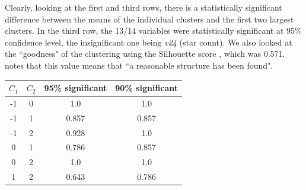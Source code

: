 \documentclass[12pt,a4paper,twocolumn]{article}
\begin{document}
	Clearly, looking at the first and third rows, there is a statistically significant difference between the means of the individual clusters and the first two largest clusters. In the third row, the 13/14 variables were statistically significant at 95\% confidence level, the insignificant one being \textit{v24} (star count). We also looked at the ``goodness" of the clustering using the Silhouette score \cite{rousseeuw1987silhouettes}, which was 0.571. \cite{kaufman2009finding} notes that this value means that ``a reasonable structure has been found".\\
	
	\begin{tabular}{|c|c|c|c|}
		\hline 
		$C_1$ & $C_2$ & \textbf{95\% significant} & \textbf{90\% significant} \\ 
		\hline 
		-1 & 0 & 1.0 & 1.0 \\ 
		\hline 
		-1 & 1 & 0.857 & 0.857 \\ 
		\hline 
		-1 & 2 & 0.928 & 1.0 \\ 
		\hline 
		0 & 1 & 0.786 & 0.857 \\ 
		\hline 
		0 & 2 & 1.0 & 1.0 \\ 
		\hline 
		1 & 2 & 0.643 & 0.786 \\ 
		\hline 
	\end{tabular} 
	\begingroup
	\endgroup
	\hfill\break
	
	
	
\end{document}

